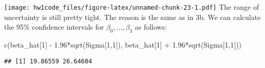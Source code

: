 \documentclass[
]{article}
\newenvironment{Shaded}{\begin{snugshade}}{\end{snugshade}}
\newcommand{\AttributeTok}[1]{\textcolor[rgb]{0.77,0.63,0.00}{#1}}
\newcommand{\ControlFlowTok}[1]{\textcolor[rgb]{0.13,0.29,0.53}{\textbf{#1}}}
\newcommand{\DecValTok}[1]{\textcolor[rgb]{0.00,0.00,0.81}{#1}}
\newcommand{\FloatTok}[1]{\textcolor[rgb]{0.00,0.00,0.81}{#1}}
\newcommand{\FunctionTok}[1]{\textcolor[rgb]{0.00,0.00,0.00}{#1}}
\newcommand{\NormalTok}[1]{#1}
\newcommand{\OtherTok}[1]{\textcolor[rgb]{0.56,0.35,0.01}{#1}}
\newcommand{\SpecialCharTok}[1]{\textcolor[rgb]{0.00,0.00,0.00}{#1}}
\newcommand{\StringTok}[1]{\textcolor[rgb]{0.31,0.60,0.02}{#1}}
\begin{document}
\begin{Shaded}
\end{Shaded}

\texttt{[image: hw1code\_files/figure-latex/unnamed-chunk-23-1.pdf]} The
range of uncertainty is still pretty tight. The reason is the same as in
3b. We can calculate the 95\% confidence intervals for
\(\beta_0, ..., \beta_3\) as follows:

\begin{Shaded}
\begin{Highlighting}[]
\FunctionTok{c}\NormalTok{(beta\_hat[}\DecValTok{1}\NormalTok{] }\SpecialCharTok{{-}} \FloatTok{1.96}\SpecialCharTok{*}\FunctionTok{sqrt}\NormalTok{(Sigma[}\DecValTok{1}\NormalTok{,}\DecValTok{1}\NormalTok{]), beta\_hat[}\DecValTok{1}\NormalTok{] }\SpecialCharTok{+} \FloatTok{1.96}\SpecialCharTok{*}\FunctionTok{sqrt}\NormalTok{(Sigma[}\DecValTok{1}\NormalTok{,}\DecValTok{1}\NormalTok{]))}
\end{Highlighting}
\end{Shaded}

\begin{verbatim}
## [1] 19.86559 26.64604
\end{verbatim}
\end{document}
